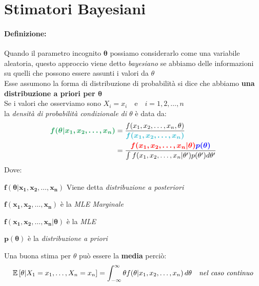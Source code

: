 \documentclass[]{article}
\makeatletter
\def\mathcolor#1#{\@mathcolor{#1}}
\def\@mathcolor#1#2#3{%
  \protect\leavevmode
  \begingroup
    \color#1{#2}#3%
  \endgroup
}
\newcommand{\ev}{\mathbb{E}[X]}
\renewcommand{\ev}[1]{\mathbb{E}\left[#1\right]}
\newcommand{\definizione}{\paragraph{Definizione:}}
\makeatother
\begin{document}
    \section{Stimatori Bayesiani}
    \definizione Quando il parametro incognito $\boldsymbol{\theta}$ possiamo considerarlo come una variabile aleatoria, questo approccio viene detto \textit{bayesiano} se abbiamo delle informazioni su quelli che possono essere assunti i valori da $\theta$ \\
    Esse assumono la forma di distribuzione di probabilità si dice che abbiamo \textbf{una distribuzione a priori per $\boldsymbol{\theta}$} \\[2ex]
    Se i valori che osserviamo sono $X_i = x_i \quad \text{e} \quad i=1,2, \ldots, n$ \\
    la \textit{densità di probabilità condizionale di $\theta$} è data da:
    \begin{equation*}
        \begin{split}
            \mathcolor{ForestGreen}{\boldsymbol{f(\theta \rvert x_1, x_2, \ldots, x_n)}} &= \frac{f(x_1, x_2, \ldots, x_n, \theta)}{\mathcolor{Turquoise}{\boldsymbol{f(x_1, x_2, \ldots, x_n)}}} \\
            &= \frac{\mathcolor{red}{\boldsymbol{f(x_1, x_2, \ldots, x_n \rvert \theta)}} \mathcolor{blue}{\boldsymbol{p(\theta)}}}{\int_{}^{} f(x_1, x_2, \ldots, x_n \rvert \theta') p(\theta') d\theta'}
        \end{split}
    \end{equation*}
    Dove:
    \begin{itemize}
        {\color{ForestGreen} \item $\boldsymbol{f(\theta \rvert x_1, x_2, \ldots, x_n)}$ Viene detta \textit{distribuzione a posteriori}}
        {\color{Turquoise} \item $\boldsymbol{f(x_1, x_2, \ldots, x_n)}$ è la \textit{MLE Marginale}}
        {\color{red} \item $\boldsymbol{f(x_1, x_2, \ldots, x_n \rvert \theta)}$ è la \textit{MLE}}
        {\color{blue} \item $\boldsymbol{p(\theta)}$ è la \textit{distribuzione a priori}}
    \end{itemize}
    Una buona stima per $\theta$ può essere la \textbf{media} perciò:
    \[ \ev{\theta \rvert X_1 = x_1, \ldots, X_n = x_n} = \int_{-\infty}^{\infty} \theta f(\theta \rvert x_1, x_2, \ldots, x_n) \, d\theta \quad \text{\textit{nel caso continuo}} \]
\end{document}

